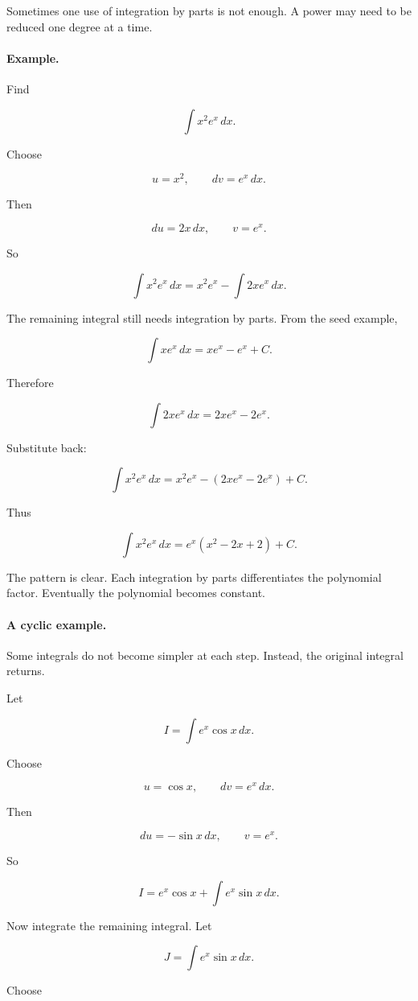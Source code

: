 Sometimes one use of integration by parts is not enough.  A power may need to be
reduced one degree at a time.

\paragraph{Example.}
Find

\[
\int x^2 e^x\,dx.
\]

Choose

\[
u=x^2,
\qquad
dv=e^x\,dx.
\]

Then

\[
du=2x\,dx,
\qquad
v=e^x.
\]

So

\[
\int x^2 e^x\,dx
=
x^2e^x-\int 2x e^x\,dx.
\]

The remaining integral still needs integration by parts.  From the seed example,

\[
\int x e^x\,dx=xe^x-e^x+C.
\]

Therefore

\[
\int 2x e^x\,dx
=
2xe^x-2e^x.
\]

Substitute back:

\[
\int x^2 e^x\,dx
=
x^2e^x-(2xe^x-2e^x)+C.
\]

Thus

\[
\boxed{
\int x^2 e^x\,dx
=
e^x(x^2-2x+2)+C.
}
\]

The pattern is clear.  Each integration by parts differentiates the polynomial factor.
Eventually the polynomial becomes constant.

\paragraph{A cyclic example.}
Some integrals do not become simpler at each step.  Instead, the original integral
returns.

Let

\[
I=\int e^x\cos x\,dx.
\]

Choose

\[
u=\cos x,
\qquad
dv=e^x\,dx.
\]

Then

\[
du=-\sin x\,dx,
\qquad
v=e^x.
\]

So

\[
I=e^x\cos x+\int e^x\sin x\,dx.
\]

Now integrate the remaining integral.  Let

\[
J=\int e^x\sin x\,dx.
\]

Choose

